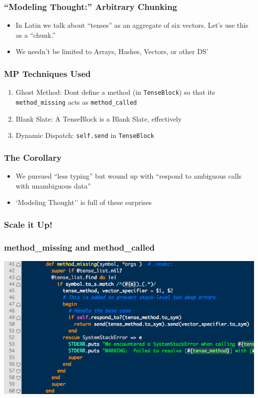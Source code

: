 \documentclass[slidestop,compress,mathserif]{beamer}
\begin{document}
\begin{frame}
	\frametitle{ ``Modeling Thought:''  Arbitrary Chunking}
	\begin{itemize}
		\item In Latin we talk about ``tenses'' as an aggregate of six vectors.  Let's use this as a ``chunk.''
		\pause
		\item We needn't be limited to Arrays, Hashes, Vectors, or other DS'
	\end{itemize}
\end{frame}

\begin{frame}
	\frametitle{MP Techniques Used}
	\begin{enumerate}
		\item Ghost Method:  Dont define a method (in \texttt{TenseBlock}) so that its \texttt{method\_missing} acts as \texttt{method\_called}
		\item Blank Slate:  A TenseBlock is a Blank Slate, effectively
		\item Dynamic Dispatch:  \texttt{self.send} in \texttt{TenseBlock}
	\end{enumerate}
\end{frame}

\begin{frame}
	\frametitle{The Corollary}
	\begin{itemize}
		\item 	We pursued ``less typing'' but wound up with ``respond to ambiguous calls with unambiguous data''
		\pause
		\item 	`Modeling Thought'' is full of these surprises
	\end{itemize}
\end{frame}

\begin{frame}
	\frametitle{Scale it Up!}
	\frametitle{method\_missing and method\_called}
	\includegraphics[scale=0.45]{img/lv_mm.png}	
\end{frame}
\end{document}
